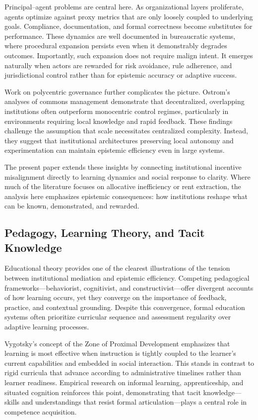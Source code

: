 \documentclass[11pt]{article}
\begin{document}
Principal–agent problems are central here. As organizational layers proliferate, agents optimize against proxy metrics that are only loosely coupled to underlying goals. Compliance, documentation, and formal correctness become substitutes for performance. These dynamics are well documented in bureaucratic systems, where procedural expansion persists even when it demonstrably degrades outcomes. Importantly, such expansion does not require malign intent. It emerges naturally when actors are rewarded for risk avoidance, rule adherence, and jurisdictional control rather than for epistemic accuracy or adaptive success.

Work on polycentric governance further complicates the picture. Ostrom’s analyses of commons management demonstrate that decentralized, overlapping institutions often outperform monocentric control regimes, particularly in environments requiring local knowledge and rapid feedback. These findings challenge the assumption that scale necessitates centralized complexity. Instead, they suggest that institutional architectures preserving local autonomy and experimentation can maintain epistemic efficiency even in large systems.

The present paper extends these insights by connecting institutional incentive misalignment directly to learning dynamics and social response to clarity. Where much of the literature focuses on allocative inefficiency or rent extraction, the analysis here emphasizes epistemic consequences: how institutions reshape what can be known, demonstrated, and rewarded.

\subsection{Pedagogy, Learning Theory, and Tacit Knowledge}

Educational theory provides one of the clearest illustrations of the tension between institutional mediation and epistemic efficiency. Competing pedagogical frameworks—behaviorist, cognitivist, and constructivist—offer divergent accounts of how learning occurs, yet they converge on the importance of feedback, practice, and contextual grounding. Despite this convergence, formal education systems often prioritize curricular sequence and assessment regularity over adaptive learning processes.

Vygotsky’s concept of the Zone of Proximal Development emphasizes that learning is most effective when instruction is tightly coupled to the learner’s current capabilities and embedded in social interaction. This stands in contrast to rigid curricula that advance according to administrative timelines rather than learner readiness. Empirical research on informal learning, apprenticeship, and situated cognition reinforces this point, demonstrating that tacit knowledge—skills and understandings that resist formal articulation—plays a central role in competence acquisition.
\end{document}
